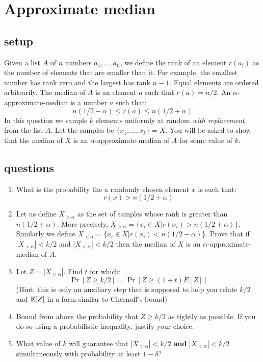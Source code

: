 \documentclass{article}
\begin{document}



\section{Approximate median}
\subsection*{setup}
Given a list $A$ of $n$ numbers $a_1,\ldots,a_n$, we define the rank
of an element $r(a_i)$ as the number of elements that are smaller
than it. For example, the smallest number has rank zero and the
largest has rank $n-1$. Equal elements are ordered arbitrarily. The
median of $A$ is an element $a$ such that $r(a) = n/2$. 
An $\alpha$-approximate-median is a number $a$
such that:
\[
n(1/2 - \alpha) \le r(a) \le n(1/2 + \alpha)
\]
In this question we sample $k$ elements uniformly at random {\it
with replacement} from the list $A$. Let the samples be
$\{x_1,\ldots,x_k\} = X$. You will be asked to show that the median of
$X$ is an $\alpha$-approximate-median of $A$ for some value of $k$.

\subsection*{questions}
\begin{enumerate}
\item What is the probability the a randomly chosen element $x$ is
such that:
\[
r(x) > n(1/2 + \alpha)
\]
\item Let us define $X_{>\alpha}$ as the set of samples whose rank
is greater than $n(1/2 + \alpha)$. More precisely, $X_{>\alpha} =
\{x_i \in X | r(x_i) > n(1/2 + \alpha)\}$. Similarly we define
$X_{<\alpha} = \{x_i \in X | r(x_i) < n(1/2 - \alpha)\}$. Prove that
if $|X_{>\alpha}| < k/2$ and $|X_{<\alpha}| < k/2$ then the median
of $X$ is an $\alpha$-approximate-median of $A$.
\item Let $Z = |X_{>\alpha}|$. Find $t$ for which:
\[
\Pr[Z \ge k/2] = \Pr[Z \ge (1+t)E[Z]]
\]
(Hint: this is only an auxiliary step that is supposed to help you relate $k/2$ and ${\mathbb E}[Z]$ in a form similar to Chernoff's bound)
\item Bound from above the probability that $Z \ge k/2$ as tightly
as possible. If you do so using a probabilistic inequality, justify
your choice.
\item What value of $k$ will guarantee that $|X_{>\alpha}| < k/2$ {\bf and} $|X_{<\alpha}| < k/2$ simultaneously with
probability at least $1-\delta$?
\end{enumerate}
\pagebreak
\end{document}
